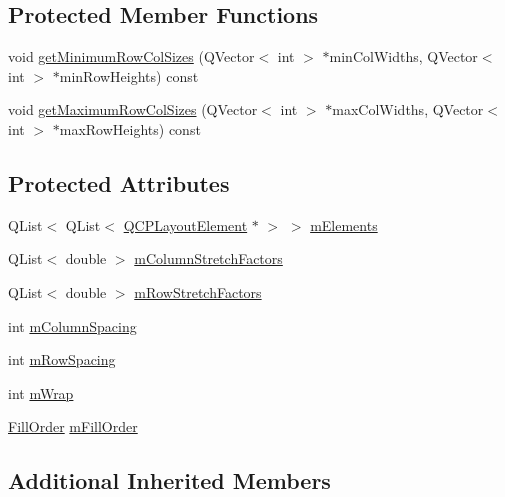\subsection*{Protected Member Functions}
\begin{DoxyCompactItemize}
\item 
void \mbox{\hyperlink{class_q_c_p_layout_grid_a4b9a251919936f127a63fc1b9911cd4e}{get\+Minimum\+Row\+Col\+Sizes}} (Q\+Vector$<$ int $>$ $\ast$min\+Col\+Widths, Q\+Vector$<$ int $>$ $\ast$min\+Row\+Heights) const
\item 
void \mbox{\hyperlink{class_q_c_p_layout_grid_a9be77011ec5b5dfbe7fbda126659e1eb}{get\+Maximum\+Row\+Col\+Sizes}} (Q\+Vector$<$ int $>$ $\ast$max\+Col\+Widths, Q\+Vector$<$ int $>$ $\ast$max\+Row\+Heights) const
\end{DoxyCompactItemize}
\subsection*{Protected Attributes}
\begin{DoxyCompactItemize}
\item 
Q\+List$<$ Q\+List$<$ \mbox{\hyperlink{class_q_c_p_layout_element}{Q\+C\+P\+Layout\+Element}} $\ast$ $>$ $>$ \mbox{\hyperlink{class_q_c_p_layout_grid_a3577d3855bf8ad20ef9079291a49f397}{m\+Elements}}
\item 
Q\+List$<$ double $>$ \mbox{\hyperlink{class_q_c_p_layout_grid_ac6aabe62339f94f18b9f8adab94b1840}{m\+Column\+Stretch\+Factors}}
\item 
Q\+List$<$ double $>$ \mbox{\hyperlink{class_q_c_p_layout_grid_a36c85a7eaf342680fb9b8a4977486f16}{m\+Row\+Stretch\+Factors}}
\item 
int \mbox{\hyperlink{class_q_c_p_layout_grid_ae9ac48f0791be07ead0a96dbd5622770}{m\+Column\+Spacing}}
\item 
int \mbox{\hyperlink{class_q_c_p_layout_grid_a8b67f183f4645739cc4c794d75843b40}{m\+Row\+Spacing}}
\item 
int \mbox{\hyperlink{class_q_c_p_layout_grid_a17d90c289139847f68cca9e75d64b0fd}{m\+Wrap}}
\item 
\mbox{\hyperlink{class_q_c_p_layout_grid_a7d49ee08773de6b2fd246edfed353cca}{Fill\+Order}} \mbox{\hyperlink{class_q_c_p_layout_grid_a35a20072cbca5659dd75ca74eae87beb}{m\+Fill\+Order}}
\end{DoxyCompactItemize}
\subsection*{Additional Inherited Members}


